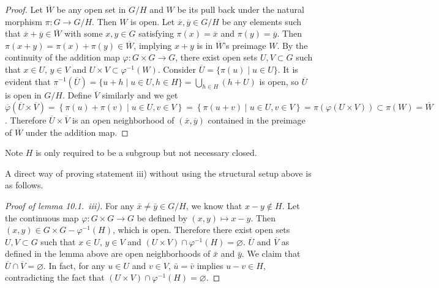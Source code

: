 \documentclass{note}
\begin{document}
\begin{proof}
  Let $\overline{W}$ be any open set in $G/H$ and $W$ be its pull back under the
  natural morphism $\pi\colon G \to G/H$. Then $W$ is open. Let $\overline{x},
    \overline{y} \in G/H$ be any elements such that $\overline{x} + \overline{y}
    \in \overline{W}$ with some $x, y \in G$ satisfying $\pi(x) = \overline{x}$ and
  $\pi(y) = \overline{y}$. Then $\pi(x + y) = \pi(x) + \pi(y) \in
    \overline{W}$,
  implying $x + y$ is in $\overline{W}$'s preimage $W$. By the continuity of the
  addition map $\varphi\colon G \times G \to G$, there exist open sets $U,V
    \subset G$ such that $x\in U$, $y\in V$ and $U\times V \subset
    \varphi^{-1}(W)$. Consider $\overline{U} = \{\pi(u) \mid u \in U\}$. It is
  evident that $\pi^{-1}\left(\overline{U}\right) = \{u+h \mid u \in U, h \in H\}
    = \bigcup_{h\in H}(h+U)$ is open, so $\overline{U}$ is open in $G/H$. Define
  $\overline{V}$ similarly and we get
  $\overline\varphi\left(\overline{U}\times\overline{V}\right) =
    \left\{\pi(u)+\pi(v) \mid u\in U, v\in
    V\right\} = \left\{\pi(u+v) \mid u\in U,
    v\in V\right\} = \pi\left(\varphi\left(U\times V\right)\right) \subset \pi(W) =
    \overline{W}$. Therefore $\overline{U} \times \overline{V}$ is an open
  neighborhood of $\left(\overline{x}, \overline{y}\right)$ contained in the
  preimage of $\overline{W}$ under the addition map.
\end{proof}

\begin{remark*}
  Note $H$ is only required to be a subgroup but not necessary closed.
\end{remark*}

A direct way of proving statement iii) without using the structural setup above
is as follows.

\begin{proof}[Proof of lemma 10.1.~iii)] For any
  $\bar{x} \neq \bar{y} \in G/H$, we know that $x - y \notin H$. Let
  the continuous map $\varphi\colon G\times G \to G$ be defined by $(x,y) \mapsto
    x - y$. Then $(x,y) \in G\times G - \varphi^{-1}(H)$, which is open. Therefore
  there exist open sets $U,V \subset G$ such that $x\in U$, $y\in V$ and
  $(U\times V) \cap \varphi^{-1}(H) = \varnothing$. $\overline{U}$ and
  $\overline{V}$ as defined in the lemma above are open neighborhoods of
  $\bar{x}$ and $\bar{y}$. We claim that $\overline{U} \cap \overline{V} =
    \varnothing$. In fact, for any $u\in U$ and $v\in V$, $\bar{u} = \bar{v}$
  implies $u - v \in H$, contradicting the fact that $(U\times V) \cap
    \varphi^{-1}(H) = \varnothing$.
\end{proof}
\end{document}
